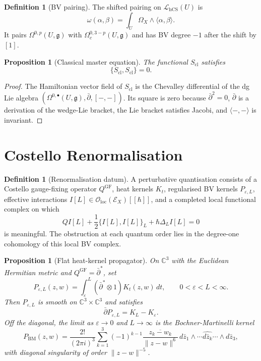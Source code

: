 \documentclass[11pt]{amsart}
\providecommand{\C}{\mathbb{C}}
\providecommand{\dbar}{\bar{\partial}}
\providecommand{\dbarstar}{\bar{\partial}^{\ast}}
\providecommand{\fg}{\mathfrak{g}}
\providecommand{\hCS}{\operatorname{hCS}}
\providecommand{\cE}{\mathcal{E}}
\providecommand{\cO}{\mathcal{O}}
\providecommand{\cL}{\mathcal{L}}
\theoremstyle{plain}
\newtheorem{proposition}[theorem]{Proposition}
\theoremstyle{definition}
\newtheorem{definition}[theorem]{Definition}
\theoremstyle{remark}
\begin{document}
\begin{definition}[BV pairing]
\label{def:bv-pairing}
The shifted pairing on $\cL_{\hCS}(U)$ is
\[
  \omega(\alpha,\beta)
  =
  \int_U \Omega_X\wedge\langle\alpha,\beta\rangle .
\]
It pairs $\Omega^{0,p}(U,\fg)$ with $\Omega^{0,3-p}_c(U,\fg)$ and has
BV degree $-1$ after the shift by $[1]$.
\end{definition}

\begin{proposition}[Classical master equation]
\label{prop:cme}
The functional $S_{\mathrm{cl}}$ satisfies
\[
  \{S_{\mathrm{cl}},S_{\mathrm{cl}}\}=0 .
\]
\end{proposition}

\begin{proof}
The Hamiltonian vector field of $S_{\mathrm{cl}}$ is the Chevalley
differential of the dg Lie algebra
$(\Omega^{0,\bullet}(U,\fg),\dbar,[-,-])$.  Its square is zero because
$\dbar^2=0$, $\dbar$ is a derivation of the wedge-Lie bracket, the
Lie bracket satisfies Jacobi, and $\langle-,-\rangle$ is invariant.
\end{proof}

\section{Costello Renormalisation}
\label{sec:costello-renormalisation}

\begin{definition}[Renormalisation datum]
\label{def:renormalisation-datum}
A perturbative quantisation consists of a Costello gauge-fixing
operator $Q^{\mathrm{GF}}$, heat kernels $K_t$, regularised BV kernels
$P_{\varepsilon,L}$, effective interactions
$I[L]\in\cO_{\mathrm{loc}}(\cE_X)[[\hbar]]$, and a completed local
functional complex on which
\[
  QI[L]+\frac12\{I[L],I[L]\}_L+\hbar\Delta_L I[L]=0
\]
is meaningful.  The obstruction at each quantum order lies in the
degree-one cohomology of this local BV complex.
\end{definition}

\begin{proposition}[Flat heat-kernel propagator]
\label{prop:flat-propagator}
On $\C^3$ with the Euclidean Hermitian metric and
$Q^{\mathrm{GF}}=\dbarstar$, set
\[
  P_{\varepsilon,L}(z,w)
  =
  \int_{\varepsilon}^{L}(\dbarstar\otimes1)K_t(z,w)\,dt,
  \qquad
  0<\varepsilon<L<\infty .
\]
Then $P_{\varepsilon,L}$ is smooth on $\C^3\times\C^3$ and satisfies
\[
  \dbar P_{\varepsilon,L}=K_L-K_\varepsilon .
\]
Off the diagonal, the limit as $\varepsilon\to0$ and $L\to\infty$ is
the Bochner-Martinelli kernel
\[
  P_{\mathrm{BM}}(z,w)
  =
  \frac{2!}{(2\pi i)^3}
  \sum_{k=1}^{3}(-1)^{k-1}
  \frac{\overline{z_k-w_k}}{\|z-w\|^6}\,
  d\bar z_1\wedge\cdots\widehat{d\bar z_k}\cdots\wedge d\bar z_3 ,
\]
with diagonal singularity of order $\|z-w\|^{-5}$.
\end{proposition}
\end{document}
